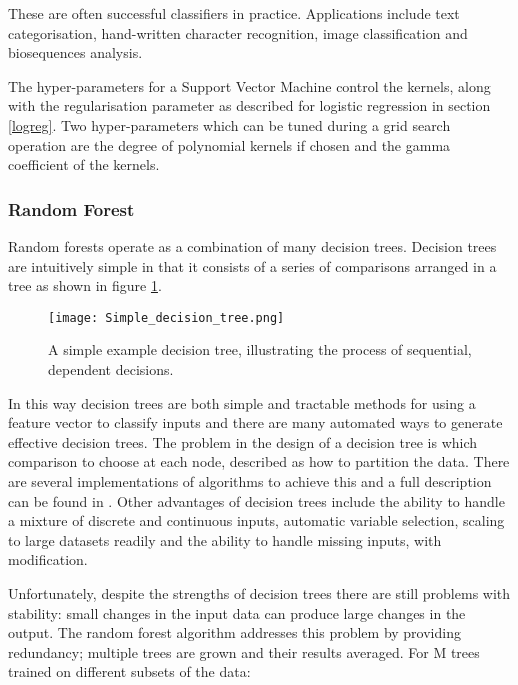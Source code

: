 These are often successful classifiers in practice.
Applications include text categorisation, hand-written character recognition, image classification and biosequences analysis\autocite{cristianini_an_2000}.

The hyper-parameters for a Support Vector Machine control the kernels, along with the regularisation parameter as described for logistic regression in section \ref{logreg}.
Two hyper-parameters which can be tuned during a grid search operation are the degree of polynomial kernels if chosen and the gamma coefficient of the kernels.


\subsubsection*{Random Forest}
\label{randomforest}

Random forests operate as a combination of many decision trees.
Decision trees are intuitively simple in that it consists of a series of comparisons arranged in a tree as shown in figure \ref{fig:dectree}.

\begin{figure}
    \centering
    \texttt{[image: Simple\_decision\_tree.png]}
    \caption{A simple example decision tree, illustrating the process of sequential, dependent decisions.}
    \label{fig:dectree}
\end{figure}

In this way decision trees are both simple and tractable methods for using a feature vector to classify inputs and there are many automated ways to generate effective decision trees.
The problem in the design of a decision tree is which comparison to choose at each node, described as how to partition the data\autocite[544]{murphy_machine_2012}. %
There are several implementations of algorithms to achieve this and a full description can be found in \textcite[544]{murphy_machine_2012}.
Other advantages of decision trees include the ability to handle a mixture of discrete and continuous inputs, automatic variable selection, scaling to large datasets readily and the ability to handle missing inputs, with modification.


Unfortunately, despite the strengths of decision trees there are still problems with stability: small changes in the input data can produce large changes in the output\autocite{murphy_machine_2012}.
The random forest algorithm addresses this problem by providing redundancy; multiple trees are grown and their results averaged.
For M trees trained on different subsets of the data\autocite{murphy_machine_2012}:

